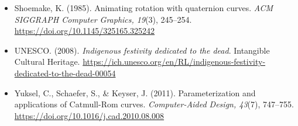 \documentclass[letter,12pt]{article}
\begin{document}
\begin{itemize}[leftmargin=*]
		\item Shoemake, K. (1985). Animating rotation with quaternion curves. \textit{ACM SIGGRAPH Computer Graphics, 19}(3), 245--254. \url{https://doi.org/10.1145/325165.325242}
		\item UNESCO. (2008). \textit{Indigenous festivity dedicated to the dead}. Intangible Cultural Heritage. \url{https://ich.unesco.org/en/RL/indigenous-festivity-dedicated-to-the-dead-00054}
		\item Yuksel, C., Schaefer, S., \& Keyser, J. (2011). Parameterization and applications of Catmull-Rom curves. \textit{Computer-Aided Design, 43}(7), 747--755. \url{https://doi.org/10.1016/j.cad.2010.08.008}
	\end{itemize}
\end{document}
